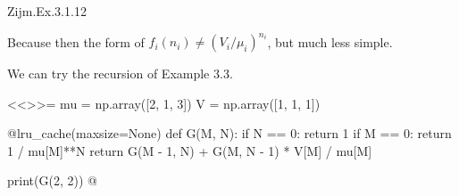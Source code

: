 \begin{question}
Zijm.Ex.3.1.12
\begin{solution}
  Because then the form of $f_i(n_i)\neq (V_i/\mu_i)^{n_i}$, but much
  less simple.

We can try the recursion of Example 3.3.

<<>>=
mu = np.array([2, 1, 3])
V = np.array([1, 1, 1])


@lru_cache(maxsize=None)
def G(M, N):
    if N == 0:
        return 1
    if M == 0:
        return 1 / mu[M]**N
    return G(M - 1, N) + G(M, N - 1) * V[M] / mu[M]

print(G(2, 2))
@

\end{solution}
\end{question}

